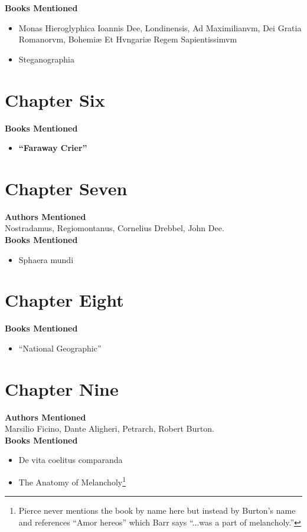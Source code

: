 \documentclass[12pt,makeidx]{extreport}
\begin{document}
\hspace{-1.5em}\textbf{Books Mentioned}
\begin{itemize}
\item Monas Hieroglyphica Ioannis Dee, Londinensis, Ad Maximilianvm, Dei Gratia Romanorvm, Bohemiæ Et Hvngariæ Regem Sapientissimvm \cite{Dee1564}
\item Steganographia \cite{Trithemius1608}
\end{itemize}

\section{Chapter Six}
\textbf{Books Mentioned}
\begin{itemize}
\item \textbf{``Faraway Crier''} \cite{faraway}
\end{itemize}

\section{Chapter Seven}
\textbf{Authors Mentioned}\\
Nostradamus, Regiomontanus, Cornelius Drebbel, John Dee.
\\

\hspace{-1.5em}\textbf{Books Mentioned}
\begin{itemize}
\item Sphaera mundi \cite{JSB1490}
\end{itemize}

\section{Chapter Eight}
\textbf{Books Mentioned}
\begin{itemize}
\item ``National Geographic'' \cite{natgeo}
\end{itemize}

\section{Chapter Nine}
\textbf{Authors Mentioned}\\
Marsilio Ficino, Dante Aligheri, Petrarch, Robert Burton.
\\

\hspace{-1.5em}\textbf{Books Mentioned}
\begin{itemize}
\item De vita coelitus comparanda \cite{Ficino1560}
\item The Anatomy of Melancholy\footnote{Pierce never mentions the book by name here but instead by Burton’s name and references ``Amor hereos'' which Barr says ``...was a part of melancholy.''} \cite{Burton1863}
\end{itemize}
\end{document}
